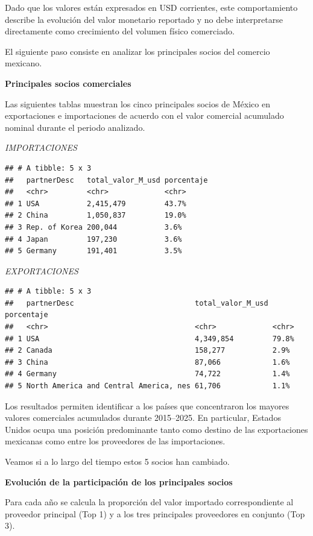\documentclass[
]{article}
\begin{document}
Dado que los valores están expresados en USD corrientes, este
comportamiento describe la evolución del valor monetario reportado y no
debe interpretarse directamente como crecimiento del volumen físico
comerciado.

El siguiente paso consiste en analizar los principales socios del
comercio mexicano.

\textbf{Principales socios comerciales}

Las siguientes tablas muestran los cinco principales socios de México en
exportaciones e importaciones de acuerdo con el valor comercial
acumulado nominal durante el periodo analizado.

\emph{IMPORTACIONES}

\begin{verbatim}
## # A tibble: 5 x 3
##   partnerDesc   total_valor_M_usd porcentaje
##   <chr>         <chr>             <chr>     
## 1 USA           2,415,479         43.7%     
## 2 China         1,050,837         19.0%     
## 3 Rep. of Korea 200,044           3.6%      
## 4 Japan         197,230           3.6%      
## 5 Germany       191,401           3.5%
\end{verbatim}

\emph{EXPORTACIONES}

\begin{verbatim}
## # A tibble: 5 x 3
##   partnerDesc                            total_valor_M_usd porcentaje
##   <chr>                                  <chr>             <chr>     
## 1 USA                                    4,349,854         79.8%     
## 2 Canada                                 158,277           2.9%      
## 3 China                                  87,066            1.6%      
## 4 Germany                                74,722            1.4%      
## 5 North America and Central America, nes 61,706            1.1%
\end{verbatim}

Los resultados permiten identificar a los países que concentraron los
mayores valores comerciales acumulados durante 2015--2025. En
particular, Estados Unidos ocupa una posición predominante tanto como
destino de las exportaciones mexicanas como entre los proveedores de las
importaciones.

Veamos si a lo largo del tiempo estos 5 socios han cambiado.

\textbf{Evolución de la participación de los principales socios}

Para cada año se calcula la proporción del valor importado
correspondiente al proveedor principal (Top 1) y a los tres principales
proveedores en conjunto (Top 3).
\end{document}

